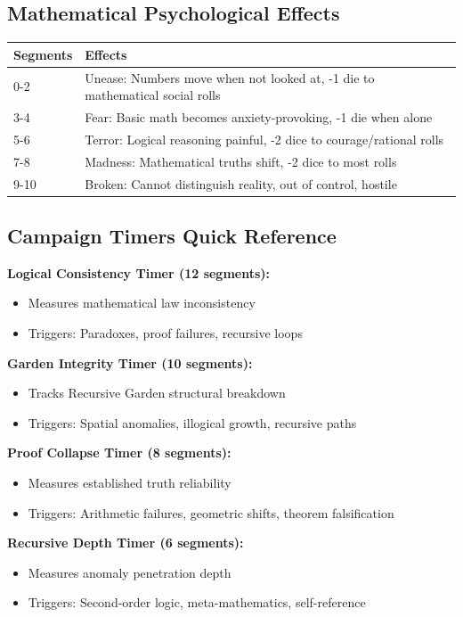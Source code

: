 \documentclass[11pt]{article}
\begin{document}
\subsection*{Mathematical Psychological Effects}

\begin{longtable}{|p{2cm}|p{10cm}|}
\hline
\rowcolor{tableheader}
\textbf{Segments} & \textbf{Effects} \\
\hline
0-2 & Unease: Numbers move when not looked at, -1 die to mathematical social rolls \\
3-4 & Fear: Basic math becomes anxiety-provoking, -1 die when alone \\
5-6 & Terror: Logical reasoning painful, -2 dice to courage/rational rolls \\
7-8 & Madness: Mathematical truths shift, -2 dice to most rolls \\
9-10 & Broken: Cannot distinguish reality, out of control, hostile \\
\hline
\end{longtable}

\subsection*{Campaign Timers Quick Reference}

\textbf{Logical Consistency Timer (12 segments):}
\begin{itemize}
\item Measures mathematical law inconsistency
\item Triggers: Paradoxes, proof failures, recursive loops
\end{itemize}

\textbf{Garden Integrity Timer (10 segments):}
\begin{itemize}
\item Tracks Recursive Garden structural breakdown
\item Triggers: Spatial anomalies, illogical growth, recursive paths
\end{itemize}

\textbf{Proof Collapse Timer (8 segments):}
\begin{itemize}
\item Measures established truth reliability
\item Triggers: Arithmetic failures, geometric shifts, theorem falsification
\end{itemize}

\textbf{Recursive Depth Timer (6 segments):}
\begin{itemize}
\item Measures anomaly penetration depth
\item Triggers: Second-order logic, meta-mathematics, self-reference
\end{itemize}
\end{document}
